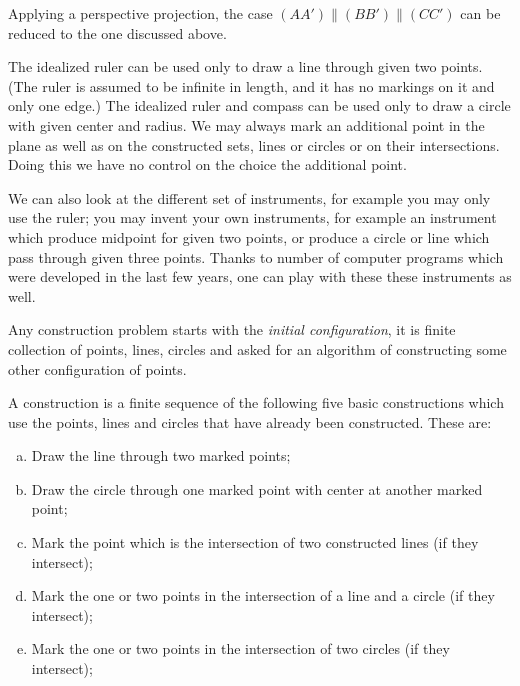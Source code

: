 {Applying a perspective projection,
the case $(AA')\parallel(BB')\parallel(CC')$ 
can be reduced to the one discussed above.
\qeds

















The idealized ruler can be used only to draw a line through given two points. (The ruler is assumed to be infinite in length, and it has no markings on it and only one edge.)
The idealized ruler and compass can be used only to draw a circle with given center and radius.
We may always mark an additional point in the plane
as well as on the constructed sets, lines or circles or on their intersections.
Doing this we have no control on the choice the additional point. 

We can also look at the different set of instruments, 
for example
you may only use the ruler;
you may invent your own instruments, for example an instrument which produce midpoint for given two points, 
or produce a circle or line which pass through given three points.
Thanks to number of computer programs which were developed in the last few years, one can play with these these instruments as well.

Any construction problem starts with the \emph{initial configuration},
it is finite collection of points, lines, circles
and asked for an algorithm of constructing some other configuration of points.

A construction is a finite sequence of the following five basic constructions which use the points, lines and circles that have already been constructed. 
These are:
\begin{enumerate}[(a)]
\item Draw the line through two marked points;
\item Draw the circle through one marked point with center at another marked point;
\item Mark the point which is the intersection of two constructed lines (if they intersect);
\item Mark the one or two points in the intersection of a line and a circle (if they intersect);
\item Mark the one or two points in the intersection of two circles (if they intersect);
\end{enumerate}

}
